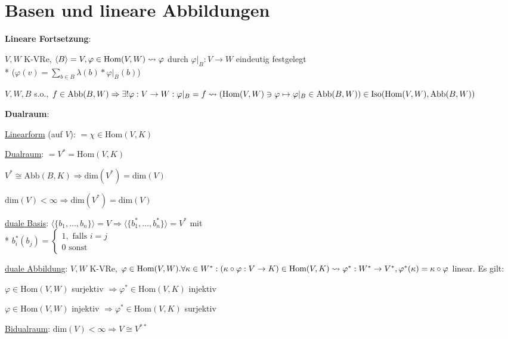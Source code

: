 \section{\label{sec:BasenLinAbb}Basen und lineare Abbildungen}

\textbf{Lineare Fortsetzung}:
\begin{items}
	\item $V, W$ K-VRe, $\langle B \rangle = V, \varphi \in \text{Hom}(V,W) \\* \leadsto \varphi$ durch $\varphi|_B: V \rightarrow W$ eindeutig festgelegt \\* ($\varphi(v)=\sum_{b \in B} \lambda(b) * \varphi|_B(b) $)
	\item $V, W, B$ s.o., $f \in \text{Abb}(B,W) \Rightarrow \exists ! \varphi: V \rightarrow W: \varphi|_B = f \\* \leadsto (\text{Hom}(V,W) \ni \varphi \mapsto \varphi|_B \in \text{Abb}(B,W)) \\* \in \text{Iso}(\text{Hom}(V,W), \text{Abb}(B,W))$
\end{items}

\textbf{Dualraum}:
\begin{items}
	\item \underline{Linearform} (auf $V$): $= \chi \in \text{Hom}(V,K)$
	\item \underline{Dualraum}: $=V^{*} = \text{Hom}(V,K)$
	\item $V^{*} \cong \text{Abb}(B,K) \Rightarrow \text{dim}(V^{*})=\text{dim}(V)$
	\item $\text{dim}(V) < \infty \Rightarrow \text{dim}(V^{*})=\text{dim}(V)$
	\item \underline{duale Basis}: $\langle \{ b_1, \dots, b_n \} \rangle = V \Rightarrow \langle \{ b_1^*, \dots, b_n^* \} \rangle = V^*$ mit \\* $b_i^*(b_j)=\begin{cases} 1, \text{ falls } i=j \\ 0 \text{ sonst} \end{cases}$
	\item \underline{duale Abbildung}: $V,W$ K-VRe, $\varphi \in \text{Hom}(V,W). \\* \forall \kappa \in W^*: (\kappa \circ \varphi: V \rightarrow K) \in \text{Hom}(V,K) \\* \leadsto \varphi^*: W^* \rightarrow V^*, \varphi^*(\kappa)=\kappa \circ \varphi$ linear. Es gilt:
	\begin{enumeration}
		\item $\varphi \in \text{Hom}(V,W)$ surjektiv $\Rightarrow \varphi^* \in \text{Hom}(V,K)$ injektiv
		\item $\varphi \in \text{Hom}(V,W)$ injektiv $\Rightarrow \varphi^* \in \text{Hom}(V,K)$ surjektiv
	\end{enumeration}
	\item \underline{Bidualraum}: $\text{dim}(V) < \infty \Rightarrow V \cong V^{**}$
\end{items}

